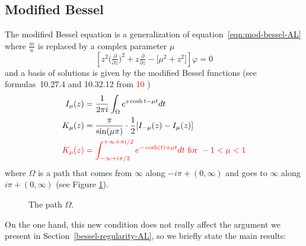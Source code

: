 \documentclass{article}
\let\Re\relax
\DeclareMathOperator{\Re}{Re}
\theoremstyle{definition}
\begin{document}
\subsection{Modified Bessel}\label{sec:mod-bessel-lift}

The modified Bessel equation is a generalization of equation~\eqref{eqn:mod-bessel-AL} where $\frac{m}{n}$ is replaced by a complex parameter $\mu$
\begin{equation}\label{eqn:mod-bessel}
\left[z^2 \big(\tfrac{\partial}{\partial z}\big)^2 + z \tfrac{\partial}{\partial z} - \big[\mu^2 + z^2\big]\right] \varphi = 0
\end{equation}
and a basis of solutions is given by the modified Bessel functions (see formulas~10.27.4 and 10.32.12 from \cite{dlmf} \textcolor{red}{10 \cite{watson1922treatise}}) 
\begin{align*}
I_{\mu}(z)&=\frac{1}{2\pi i}\int_{\Omega} e^{z\cosh t - \mu t} dt \\
K_{\mu}(z)&=\frac{\pi}{\sin(\mu \pi)}\cdot \frac{1}{2}[ I_{-\mu}(z) - I_{\mu}(z)]\\
\color{red}K_{\mu}(z)& \color{red}=\int_{-\infty+i\pi/2}^{+\infty+\pi i/2} e^{-\cosh(t)+\mu t} dt \text{  for } -1<\Re \mu<1
\end{align*} 
where $\Omega$ is a path that comes from $\infty$ along $-i \pi + (0, \infty)$ and goes to $\infty$ along $i \pi + (0, \infty)$ (see Figure \ref{fig:Omega_path}).
\begin{figure}[ht]
\center
{}
\caption{The path $\Omega$. }\label{fig:Omega_path}
\end{figure}
On the one hand, this new condition does not really affect the argument we present in Section~\ref{bessel-regularity-AL}, so we briefly state the main results: 
\end{document}
